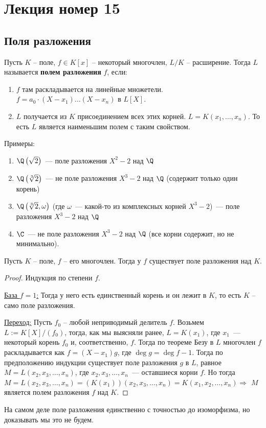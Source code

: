 \section{Лекция номер 15}
\subsection{Поля разложения}

\begin{conj}
    Пусть $K$ -- поле, $f \in K[x]$ -- некоторый многочлен, $L/K$ -- расширение. Тогда $L$ называется \textbf{полем разложения} $f$, если:
    \begin{enumerate}
        \item $f$ там раскладывается на линейные множетели. $f = a_0 \cdot (X - x_1) \dots (X - x_n)$ в $L[X]$.
        \item $L$ получается из $K$ присоединением всех этих корней. $L = K(x_1, \dots, x_n)$. То есть $L$ является наименьшим полем с таким свойством. 
    \end{enumerate}
\end{conj}
Примеры:
\begin{enumerate}
    \item $\Q\left(\sqrt 2\right)$~--- поле разложения $X^2-2$ над $\Q$
    \item $\Q\left(\sqrt[3]{2}\right)$~--- не поле разложения $X^3-2$ над $\Q$ (содержит только один корень)
    \item $\Q\left(\sqrt[3]{2}, \omega\right)$ (где $\omega$~--- какой-то из комплексных корней $X^3-2$)~--- поле разложения $X^3-2$ над $\Q$
    \item $\C$~--- не поле разложения $X^3-2$ над $\Q$ (все корни содержит, но не минимально).
\end{enumerate}

\begin{theorem}
    Пусть $K$ -- поле, $f$ -- его многочлен. Тогда у $f$ существует поле разложения над $K$. 
\end{theorem}
\begin{proof}
    Индукция по степени $f$. 

    \quad \underline{База $f = 1$:} Тогда у него есть единственный корень и он лежит в $K$, то есть $K$ -- само поле разложения. 

    \quad \underline{Переход:} Пусть $f_0$ -- любой неприводимый делитель $f$.
    Возьмем $L := K[X] / (f_0)$, тогда, как мы выясняли ранее, $L=K(x_1)$, где $x_1$~--- некоторый корень $f_0$ и, соответственно, $f$.
    Тогда по теореме Безу в $L$ многочлен $f$ раскладывается как $f=(X-x_1)g$, где $\deg g = \deg f - 1$.
    Тогда по предположению индукции существует поле разложения $g$ в $L$, равное $M=L(x_2, x_3, \ldots, x_n)$, где $x_2,x_3,\ldots, x_n$~--- оставшиеся корни $f$.
    Но тогда $M=L(x_2, x_3, \ldots, x_n) = (K(x_1))(x_2, x_3, \ldots, x_n) = K(x_1, x_2, \ldots, x_n) \Rightarrow$ $M$ является полем разложения $f$ над $K$.
\end{proof}
\notice На самом деле поле разложения единственно с точностью до изоморфизма, но доказывать мы это не будем.

